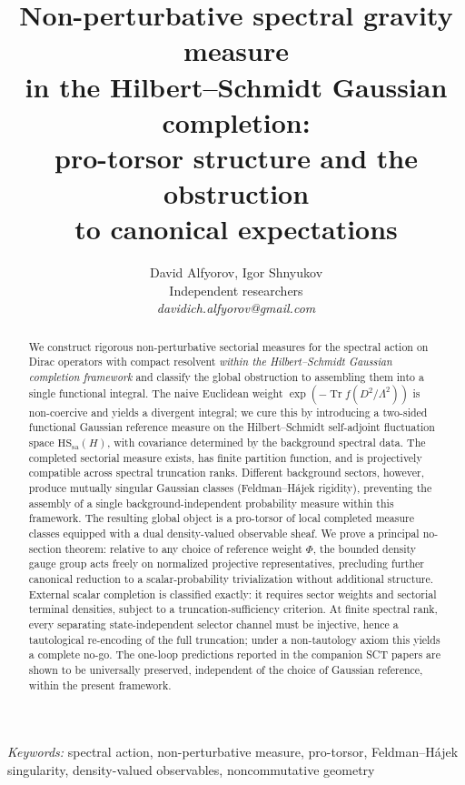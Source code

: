 \documentclass[12pt,a4paper]{article}
\title{%
  \textbf{Non-perturbative spectral gravity measure}\\[4pt]
  \textbf{in the Hilbert--Schmidt Gaussian completion:}\\[2pt]
  \textbf{pro-torsor structure and the obstruction}\\[2pt]
  \textbf{to canonical expectations}
}
\author{David Alfyorov, Igor Shnyukov\\[4pt]
\small Independent researchers\\[2pt]
\small\textit{davidich.alfyorov@gmail.com}}
\date{}
\theoremstyle{plain}
\theoremstyle{definition}
\theoremstyle{remark}
\newcommand{\Tr}{\operatorname{Tr}}
\newcommand{\HS}{\mathrm{HS}}
\newcommand{\sa}{\mathrm{sa}}
\newcommand{\Lam}{\Lambda}
\begin{document}
\maketitle

\begin{abstract}
We construct rigorous non-perturbative sectorial measures for the
spectral action on Dirac operators with compact resolvent \emph{within the
Hilbert--Schmidt Gaussian completion framework} and classify the global
obstruction to assembling them into a single functional integral.  The naive Euclidean weight
$\exp(-\Tr f(D^2/\Lam^2))$ is non-coercive and yields a divergent
integral; we cure this by introducing a two-sided functional Gaussian
reference measure on the Hilbert--Schmidt self-adjoint fluctuation
space $\HS_\sa(H)$, with covariance determined by the background
spectral data.  The completed sectorial measure exists, has finite
partition function, and is projectively compatible across spectral
truncation ranks.  Different background sectors, however, produce
mutually singular Gaussian classes (Feldman--H\'ajek rigidity),
preventing the assembly of a single background-independent probability
measure within this framework.  The resulting global object
is a pro-torsor of local completed measure classes equipped with a dual
density-valued observable sheaf.  We prove a principal no-section
theorem: relative to any choice of reference weight $\Phi$, the bounded
density gauge group acts freely on normalized projective
representatives, precluding further canonical reduction to a
scalar-probability trivialization without additional structure.  External scalar completion is
classified exactly: it requires sector weights and sectorial terminal
densities, subject to a truncation-sufficiency criterion.  At finite
spectral rank, every separating state-independent selector channel must
be injective, hence a tautological re-encoding of the full truncation;
under a non-tautology axiom this yields a complete no-go.  The
one-loop predictions reported in the companion SCT papers are shown to
be universally preserved, independent of the choice of Gaussian
reference, within the present framework.
\end{abstract}

\noindent\textit{Keywords:} spectral action, non-perturbative measure,
pro-torsor, Feldman--H\'ajek singularity, density-valued observables,
noncommutative geometry
\end{document}
